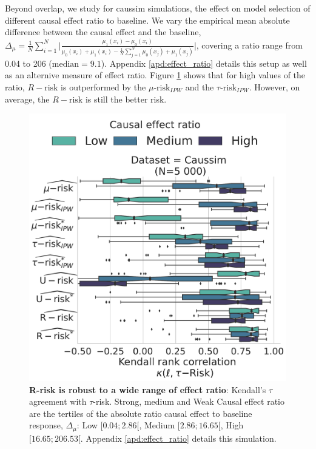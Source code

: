 \documentclass[a4paper,num-refs]{oup-contemporary}%
\begin{document}
Beyond overlap, we study for caussim simulations, the effect on model selection
of different causal effect ratio to baseline. We vary the empirical mean
absolute difference between the causal effect and the baseline, $\Delta_{\mu} = \frac{1}{N} \sum_{i=1}^N \big | \frac{\mu_{1}(x_i) - \mu_{0}(x_i)}{\mu_{0}(x_i) + \mu_{1}(x_i) - \frac{1}{N} \sum_{j=1}^N \mu_0(x_j) + \mu_1(x_j)} \big |$, covering a ratio range from 0.04 to 206 ($\text{median}=9.1$). Appendix \ref{apd:effect_ratio} details this setup as well as an alternive measure of effect ratio. Figure
\ref{fig:effect_ratio_influence} shows that for high values of the ratio,
$R-\text{risk}$ is outperformed by the $\mu\text{-risk}_{IPW}$ and the
$\tau\text{-risk}_{IPW}$. However, on average, the $R-\text{risk}$ is still the
better risk.

\begin{figure}[!tb]
    \centering
    \begin{minipage}{\linewidth}
        \includegraphics[width=0.9\linewidth]{_6_effect_ratio_sym_by_bin_comparaison_kendall_by_Dataset.pdf}
    \end{minipage}

    \caption{\textbf{R-risk is robust to a wide range of effect ratio}:
    Kendall's $\tau$ agreement with $\tau$-risk. Strong, medium and Weak Causal
    effect ratio are the tertiles of the absolute ratio causal effect to
    baseline response, $\Delta_{\mu}$: Low $[0.04;2.86[$, Medium $[2.86; 16.65[$,
    High $[16.65;206.53[$. Appendix \ref{apd:effect_ratio} details this
    simulation.}\label{fig:effect_ratio_influence}
\end{figure}
\end{document}
